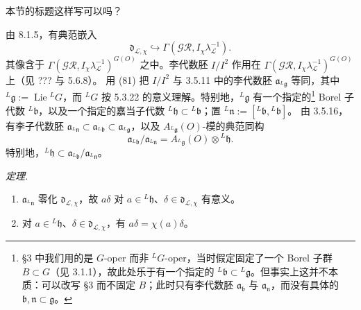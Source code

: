 




本节的标题这样写可以吗？

 由 8.1.5，有典范嵌入
\[
\mathfrak{d}_{\mathcal{L},\chi}\hookrightarrow\Gamma(\mathcal{GR},I_{\chi}\lambda_{\mathcal{L}}^{-1}).
\]
其像含于 $\Gamma(\mathcal{GR},I_{\chi}\lambda_{\mathcal{L}}^{-1})^{G(O)}$ 之中。李代数胚 $I/I^{2}$ 作用在 $\Gamma(\mathcal{GR},I_{\chi}\lambda_{\mathcal{L}}^{-1})^{G(O)}$ 上（见 ??? 与 5.6.8）。
用 (81) 把 $I/I^{2}$ 与 3.5.11 中的李代数胚 $\mathfrak{a}_{{}^{L}\mathfrak{g}}$ 等同，其中 ${}^{L}\mathfrak{g}:=\operatorname{Lie}{}^{L}G$，而 ${}^{L}G$ 按 5.3.22 的意义理解。特别地，${}^{L}\mathfrak{g}$ 有一个指定的\footnote{§3 中我们用的是 $G$-oper 而非 ${}^{L}G$-oper，当时假定固定了一个 Borel 子群 $B\subset G$（见 3.1.1），故此处乐于有一个指定的 ${}^{L}\mathfrak{b}\subset{}^{L}\mathfrak{g}$。但事实上这并不本质：可以改写 §3 而不固定 $B$；此时只有李代数胚 $\mathfrak{a}_{\mathfrak{b}}$ 与 $\mathfrak{a}_{\mathfrak{n}}$，而没有具体的 $\mathfrak{b},\mathfrak{n}\subset\mathfrak{g}$。} Borel 子代数 ${}^{L}\mathfrak{b}$，以及一个指定的嘉当子代数 ${}^{L}\mathfrak{h}\subset{}^{L}\mathfrak{b}$；置 ${}^{L}\mathfrak{n}:=[{}^{L}\mathfrak{b},{}^{L}\mathfrak{b}]$。
由 3.5.16，有李子代数胚 $\mathfrak{a}_{{}^{L}\mathfrak{n}}\subset\mathfrak{a}_{{}^{L}\mathfrak{b}}\subset\mathfrak{a}_{{}^{L}\mathfrak{g}}$，以及 $A_{{}^{L}\mathfrak{g}}(O)$-模的典范同构
\[
\mathfrak{a}_{{}^{L}\mathfrak{b}}/\mathfrak{a}_{{}^{L}\mathfrak{n}}=A_{{}^{L}\mathfrak{g}}(O)\otimes{}^{L}\mathfrak{h}.
\]
特别地，${}^{L}\mathfrak{h}\subset\mathfrak{a}_{{}^{L}\mathfrak{b}}/\mathfrak{a}_{{}^{L}\mathfrak{n}}$。

 \emph{定理.}
\begin{enumerate}[label=\roman*),leftmargin=2.2em]
\item $\mathfrak{a}_{{}^{L}\mathfrak{n}}$ 零化 $\mathfrak{d}_{\mathcal{L},\chi}$，故 $a\delta$ 对 $a\in{}^{L}\mathfrak{h}$、$\delta\in\mathfrak{d}_{\mathcal{L},\chi}$ 有意义。
\item 对 $a\in{}^{L}\mathfrak{h}$、$\delta\in\mathfrak{d}_{\mathcal{L},\chi}$，有 $a\delta=\chi(a)\delta$。
\end{enumerate}

